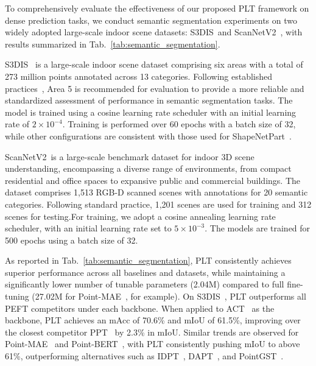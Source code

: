 

To comprehensively evaluate the effectiveness of our proposed PLT framework on dense prediction tasks, we conduct semantic segmentation experiments on two widely adopted large-scale indoor scene datasets: S3DIS~\cite{armeni20163d}and ScanNetV2~\cite{dai2017scannet}, with results summarized in Tab.~\ref{tab:semantic_segmentation}. 

S3DIS~\cite{armeni20163d} is a large-scale indoor scene dataset comprising six areas with a total of 273 million points annotated across 13 categories. Following established practices~\cite{dong2022autoencoders}, Area 5 is recommended for evaluation to provide a more reliable and standardized assessment of performance in semantic segmentation tasks. The model is trained using a cosine learning rate scheduler with an initial learning rate of $2 \times 10^{-4}$. Training is performed over 60 epochs with a batch size of 32, while other configurations are consistent with those used for ShapeNetPart~\cite{yi2016scalable}.

ScanNetV2~\cite{dai2017scannet}is a large-scale benchmark dataset for indoor 3D scene understanding, encompassing a diverse range of environments, from compact residential and office spaces to expansive public and commercial buildings. The dataset comprises 1,513 RGB-D scanned scenes with annotations for 20 semantic categories. Following standard practice, 1,201 scenes are used for training and 312 scenes for testing.For training, we adopt a cosine annealing learning rate scheduler, with an initial learning rate set to $5 \times 10^{-3}$. The models are trained for 500 epochs using a batch size of 32.

As reported in Tab.~\ref{tab:semantic_segmentation}, PLT consistently achieves superior performance across all baselines and datasets, while maintaining a significantly lower number of tunable parameters (2.04M) compared to full fine-tuning (27.02M for Point-MAE~\cite{pang2022masked}, for example). On S3DIS~\cite{armeni20163d}, PLT outperforms all PEFT competitors under each backbone. When applied to ACT~\cite{dong2022autoencoders} as the backbone, PLT achieves an mAcc of 70.6\% and mIoU of 61.5\%, improving over the closest competitor PPT~\cite{zhang2024positional} by 2.3\% in mIoU. Similar trends are observed for Point-MAE~\cite{pang2022masked} and Point-BERT~\cite{yu2022point}, with PLT consistently pushing mIoU to above 61\%, outperforming alternatives such as IDPT~\cite{zha2023instance}, DAPT~\cite{zhou2024dynamic}, and PointGST~\cite{liang2024parameter}.

